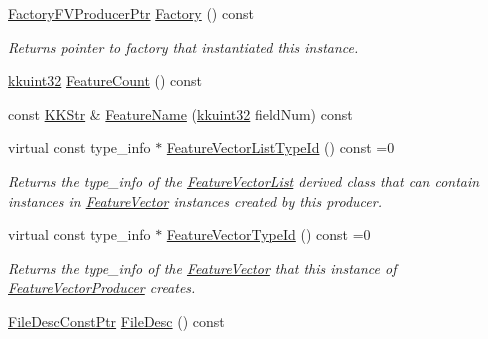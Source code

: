 \begin{DoxyCompactItemize}
\hyperlink{namespace_k_k_m_l_l_a82812d1feb85a6cff72d059bc67bb90e}{Factory\+F\+V\+Producer\+Ptr} \hyperlink{class_k_k_m_l_l_1_1_feature_vector_producer_a86e898c5da32b6fb723838644405c173}{Factory} () const 
\begin{DoxyCompactList}\small\item\em Returns pointer to factory that instantiated this instance. \end{DoxyCompactList}\item 
\hyperlink{namespace_k_k_b_af8d832f05c54994a1cce25bd5743e19a}{kkuint32} \hyperlink{class_k_k_m_l_l_1_1_feature_vector_producer_a2a4098dc40943bec4ed050c77fb261a7}{Feature\+Count} () const 
\item 
const \hyperlink{class_k_k_b_1_1_k_k_str}{K\+K\+Str} \& \hyperlink{class_k_k_m_l_l_1_1_feature_vector_producer_aed8530c81784372e6f1f0f47c5821b1d}{Feature\+Name} (\hyperlink{namespace_k_k_b_af8d832f05c54994a1cce25bd5743e19a}{kkuint32} field\+Num) const 
\item 
virtual const type\+\_\+info $\ast$ \hyperlink{class_k_k_m_l_l_1_1_feature_vector_producer_a2c22d1df90af267a264cc21ad31c369a}{Feature\+Vector\+List\+Type\+Id} () const  =0
\begin{DoxyCompactList}\small\item\em Returns the \textquotesingle{}type\+\_\+info\textquotesingle{} of the \hyperlink{class_k_k_m_l_l_1_1_feature_vector_list}{Feature\+Vector\+List} derived class that can contain instances in \textquotesingle{}\hyperlink{class_k_k_m_l_l_1_1_feature_vector}{Feature\+Vector}\textquotesingle{} instances created by this producer. \end{DoxyCompactList}\item 
virtual const type\+\_\+info $\ast$ \hyperlink{class_k_k_m_l_l_1_1_feature_vector_producer_a4562c12bc19d0eef87c54ba32cfa69ed}{Feature\+Vector\+Type\+Id} () const  =0
\begin{DoxyCompactList}\small\item\em Returns the \textquotesingle{}type\+\_\+info\textquotesingle{} of the \hyperlink{class_k_k_m_l_l_1_1_feature_vector}{Feature\+Vector} that this instance of \textquotesingle{}\hyperlink{class_k_k_m_l_l_1_1_feature_vector_producer}{Feature\+Vector\+Producer}\textquotesingle{} creates. \end{DoxyCompactList}\item 
\hyperlink{namespace_k_k_m_l_l_a7aa258340f9147d1b257c8eb81450e80}{File\+Desc\+Const\+Ptr} \hyperlink{class_k_k_m_l_l_1_1_feature_vector_producer_aeb4fa519b2559db37fa12a4d98e7c583}{File\+Desc} () const 

\end{DoxyCompactItemize}

